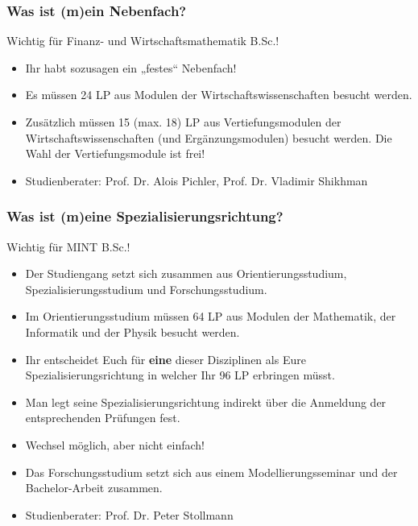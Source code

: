 \documentclass[10pt]{beamer}
\makeatletter
\newcommand{\highl}[1]{\color{tuccolor@ma}#1\color{black}}
\makeatother
\begin{document}
\begin{frame}
	\frametitle{Was ist (m)ein Nebenfach?}
	\highl{Wichtig für Finanz- und Wirtschafts­mathematik B.Sc.!}
	\begin{itemize}
		\item Ihr habt sozusagen ein „festes“ Nebenfach!
		\item Es müssen 24 LP aus Modulen der Wirtschaftswissenschaften besucht werden.
		\item Zusätzlich müssen 15 (max. 18) LP aus Vertiefungsmodulen der Wirtschaftswissenschaften (und Ergänzungsmodulen) besucht werden. Die Wahl der Vertiefungsmodule ist frei!
		\item Studienberater: Prof. Dr. Alois Pichler, Prof. Dr. Vladimir Shikhman
	\end{itemize}
\end{frame}

\begin{frame}
	\frametitle{Was ist (m)eine Spezialisierungsrichtung?}
	\highl{Wichtig für MINT B.Sc.!}
	\begin{itemize}
		\item Der Studiengang setzt sich zusammen aus Orientierungsstudium, Spezialisierungsstudium und Forschungsstudium. 
		\item Im Orientierungsstudium müssen 64 LP aus Modulen der Mathematik, der Informatik und der Physik besucht werden.
		\item Ihr entscheidet Euch für \textbf{eine} dieser Disziplinen als Eure Spezialisierungsrichtung in welcher Ihr 96 LP erbringen müsst.
		\item Man legt seine Spezialisierungsrichtung indirekt über die Anmeldung der entsprechenden Prüfungen fest.
		\item Wechsel möglich, aber nicht einfach!
		\item Das Forschungsstudium setzt sich aus einem Modellierungsseminar und der Bachelor-Arbeit zusammen.
		\item Studienberater: Prof. Dr. Peter Stollmann
	\end{itemize}
\end{frame}
\end{document}
